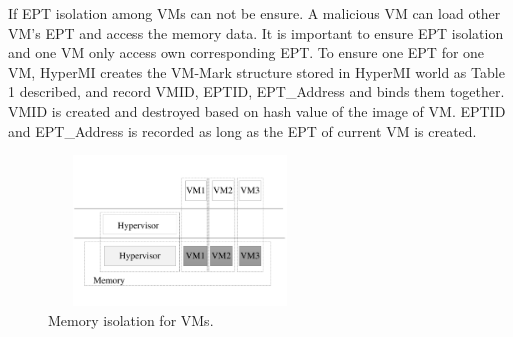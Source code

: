 \documentclass[conference]{IEEEtran}
\begin{document}
If EPT isolation among VMs can not be ensure. A malicious VM can load other VM's EPT and access the memory data. It is important to ensure EPT isolation and one VM only access own corresponding EPT.
To ensure one EPT for one VM, HyperMI creates the VM-Mark structure stored in HyperMI world as Table 1 described, and record VMID, EPTID, EPT\_Address and binds them together. VMID is created and destroyed based on hash value of the image of VM. EPTID and EPT\_Address is recorded as long as the EPT of current VM is created.

%
%

\begin{figure}
\centerline{\includegraphics[width=7cm, height=4cm]{pdfvmcs3.pdf}}%
\caption{Memory isolation for VMs.} \label{fig3}
\end{figure}
\end{document}
